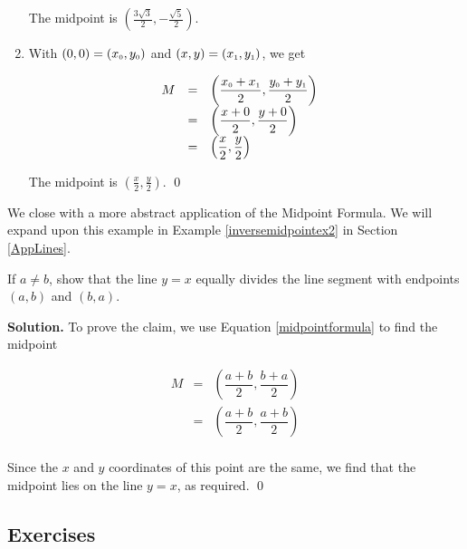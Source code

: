 \documentclass{ximera}
\begin{document}
\begin{example}
\begin{enumerate}
   The midpoint is $\left(\frac{3\sqrt{3}}{2}, -\frac{\sqrt{5}}{2} \right)$.

\item With $(0,0) =  \left(x_{\mbox{\tiny$0$}}, y_{\mbox{\tiny$0$}}\right)$ and  $(x,y) = \left(x_{\mbox{\tiny$1$}}, y_{\mbox{\tiny$1$}}\right)$, we get

\setlength{\extrarowheight}{10pt}

\[ \begin{array}{rclr}
 M & = & \left( \dfrac{x_{\mbox{\tiny$0$}}+x_{\mbox{\tiny$1$}}}{2},  \dfrac{y_{\mbox{\tiny$0$}}+y_{\mbox{\tiny$1$}}}{2} \right) & \\
   & = & \left( \dfrac{x+0}{2},  \dfrac{y+0}{2} \right) &   \\
   & = &  \left( \dfrac{x}{2},  \dfrac{y}{2} \right) &  \end{array} \]
   
 The midpoint is $\left(\frac{x}{2}, \frac{y}{2} \right)$. \qed

\end{enumerate}

\end{example}


\label{inversemidpoint}

We close with a more abstract application of the Midpoint Formula.  We will expand upon this example in Example \ref{inversemidpointex2} in Section \ref{AppLines}.  

\begin{example} \label{inversemidpointex1} If $a \neq b$, show that the line $y = x$ equally divides the line segment with endpoints $(a,b)$ and $(b,a)$.

\medskip

{\bf Solution.}  To prove the claim, we use Equation \ref{midpointformula} to find the midpoint  

\setlength{\extrarowheight}{10pt}

\[ \begin{array}{rcl}

 M & = & \left( \dfrac{a+b}{2},  \dfrac{b+a}{2} \right) \\
   & = & \left( \dfrac{a+b}{2},  \dfrac{a+b}{2} \right)  \\ \end{array} \]

Since the $x$ and $y$ coordinates of this point are the same, we find that the midpoint lies on the line $y=x$, as required. \qed

\end{example}

\setlength{\extrarowheight}{2pt}

\newpage

\subsection{Exercises}


\closegraphsfile
\end{document}
